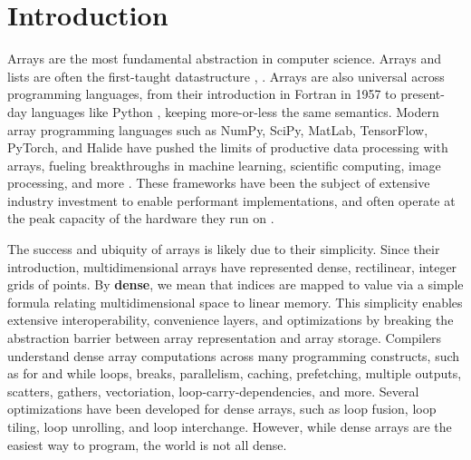 
\section{Introduction}

Arrays are the most fundamental abstraction in computer science. Arrays and lists are often the first-taught datastructure
\cite[Chapter 2.2]{abelson_structure_1996}, \cite[Chapter 2.2]{knuth_art_1997}.
%
Arrays are also universal across programming languages, from their introduction
in Fortran in 1957 to present-day languages like Python
\cite{backus_fortran_1957}, keeping more-or-less the same semantics.
%
Modern
array programming languages such as NumPy, SciPy, MatLab, TensorFlow, PyTorch,
and Halide have pushed the limits of productive data processing with arrays,
fueling breakthroughs in machine learning, scientific computing, image
processing, and more  \cite{harris_array_2020, virtanen_scipy_2020,
moler_history_2020, abadi_tensorflow_2016,
paszke_pytorch_2019,ragan-kelley_halide_2013}.
%
These frameworks have been the
subject of extensive industry investment to enable performant implementations,
and often operate at the peak capacity of the hardware they run on
\cite{lo_roofline_2015}.

The success and ubiquity of arrays is likely due to their simplicity. 
%
Since
their introduction, multidimensional arrays have represented dense, rectilinear,
integer grids of points. 
%
By \textbf{dense}, we mean that indices are mapped to value via a simple formula relating multidimensional space to linear memory.
%
%
This
simplicity enables extensive interoperability, convenience layers, and
optimizations by breaking the abstraction barrier between array representation
and array storage.  
%
Compilers understand dense array computations across many
programming constructs, such as for and while loops, breaks, parallelism,
caching, prefetching, multiple outputs, scatters, gathers, vectoriation,
loop-carry-dependencies, and more. Several optimizations have been developed for
dense arrays, such as loop fusion, loop tiling, loop unrolling, and loop
interchange.
%
However, while dense arrays are the easiest way to program, the world is not all dense.

